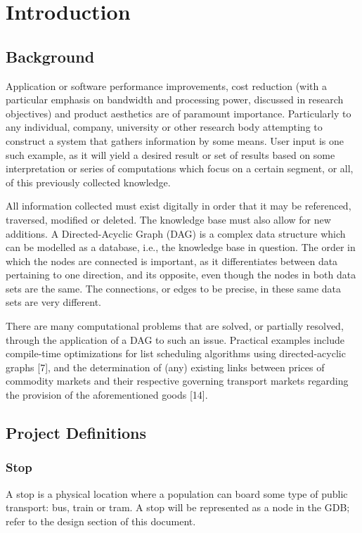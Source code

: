 \documentclass[12pt]{article}   	%
\begin{document}
\newpage

\tableofcontents
\newpage

\section{Introduction}
\subsection{Background}
Application or software performance improvements, cost reduction (with a particular emphasis on bandwidth and processing power, discussed in research objectives) and product aesthetics are of paramount importance. Particularly to any individual, company, university or other research body attempting to construct a system that gathers information by some means. User input is one such example, as it will yield a desired result or set of results based on some interpretation or series of computations which focus on a certain segment, or all, of this previously collected knowledge.

All information collected must exist digitally in order that it may be referenced, traversed, modified or deleted. The knowledge base must also allow for new additions. A Directed-Acyclic Graph (DAG) is a complex data structure which can be modelled as a database, i.e., the knowledge base in question. The order in which the nodes are connected is important, as it differentiates between data pertaining to one direction, and its opposite, even though the nodes in both data sets are the same. The connections, or edges to be precise, in these same data sets are very different.
	
There are many computational problems that are solved, or partially resolved, through the application of a DAG to such an issue. Practical examples include compile-time optimizations for list scheduling algorithms using directed-acyclic graphs [7], and the determination of (any) existing links between prices of commodity markets and their respective governing transport markets regarding the provision of the aforementioned goods [14].

\newpage

\subsection{Project Definitions}
\subsubsection{Stop}
A stop is a physical location where a population can board some type of public transport: bus, train or tram. A stop will be represented as a node in the GDB; refer to the design section of this document.
\end{document}
